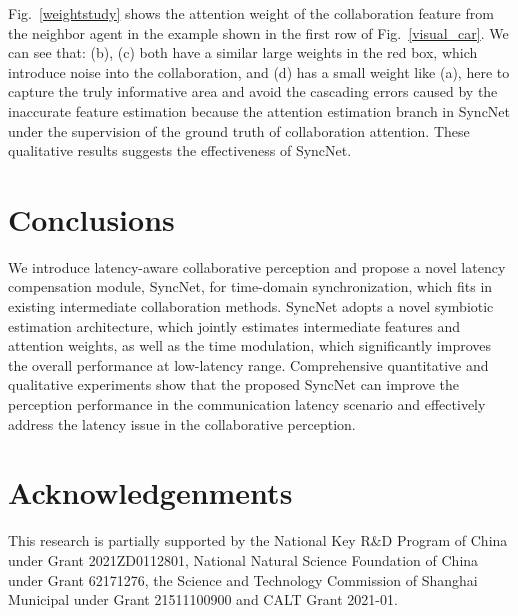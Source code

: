 \documentclass[runningheads]{llncs}
\begin{document}
Fig.~\ref{weightstudy} shows the attention weight of the collaboration feature from the neighbor agent in the example shown in the first row of Fig.~\ref{visual_car}. We can see that: (b), (c) both have a similar large weights in the red box, which introduce noise into the collaboration, and (d) has a small weight like (a), here to capture the truly informative area and avoid the cascading errors caused by the inaccurate feature estimation because the attention estimation branch in SyncNet under the supervision of the ground truth of collaboration attention. These qualitative results suggests the effectiveness of SyncNet.


\section{Conclusions}

We introduce latency-aware collaborative perception and propose a novel latency compensation module, SyncNet, for time-domain synchronization, which fits in existing intermediate collaboration methods. SyncNet adopts a novel  symbiotic estimation architecture, which jointly estimates intermediate features and attention weights, as well as the time modulation, which significantly improves the overall performance at low-latency range. Comprehensive quantitative and qualitative experiments show that the proposed SyncNet can improve the perception performance in the communication latency scenario and effectively address the latency issue in the collaborative perception.


\section*{Acknowledgenments}

This research is partially supported by the National Key R\&D Program of China under Grant 2021ZD0112801, National Natural Science Foundation of China under Grant 62171276, the Science and Technology Commission of Shanghai Municipal under Grant 21511100900 and CALT Grant 2021-01.


\clearpage
%
%


\end{document}
